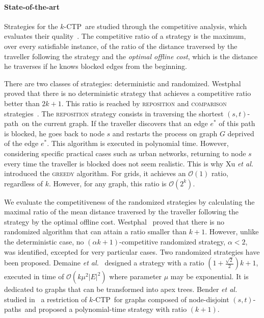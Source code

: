 \documentclass[preprint]{elsarticle}
\newcommand{\kctp}{$k$-CTP}
\newcommand{\card}[1]{\left| #1 \right|}
\newcommand{\stpath}{$(s,t)$-path}
\newcommand{\stpaths}{$(s,t)$-paths}
\begin{document}
\paragraph{State-of-the-art}
Strategies for the \kctp ~are studied through the competitive analysis, which evaluates their quality~\cite{BoEl98}. The competitive ratio of a strategy is the maximum, over every satisfiable instance, of the ratio of the distance traversed by the traveller following the strategy and the \textit{optimal offline cost}, which is the distance he traverses if he knows blocked edges from the beginning. 

There are two classes of strategies: deterministic and randomized. Westphal~\cite{We08} proved that there is no deterministic strategy that achieves a competitive ratio better than $2k+1$. This ratio is reached by \textsc{reposition} and \textsc{comparison} strategies~\cite{We08,XuHuSuZh09}. The \textsc{reposition} strategy consists in traversing the shortest \stpath ~on the current graph. If the traveller discovers that an edge $e^*$ of this path is blocked, he goes back to node $s$ and restarts the process on graph $G$ deprived of the edge $e^*$. 
This algorithm is executed in polynomial time. However, considering specific practical cases such as urban networks, returning to node $s$ every time the traveller is blocked does not seem realistic. This is why Xu {\em et al.\/}~\cite{XuHuSuZh09} introduced the \textsc{greedy} algorithm. For grids, it achieves an $\mathcal{O}\left(1\right)$ ratio, regardless of $k$. However, for any graph, this ratio is $\mathcal{O}\left(2^k\right)$.

We evaluate the competitiveness of the randomized strategies by calculating the maximal ratio of the mean distance traversed by the traveller following the strategy by the optimal offline cost. Westphal~\cite{We08} proved that there is no randomized algorithm that can attain a ratio smaller than $k+1$. However, unlike the deterministic case, no $\left(\alpha k+1\right)$-competitive randomized strategy, $\alpha < 2$, was identified, excepted for very particular cases. Two randomized strategies have been proposed. Demaine {\em et al.\/}~\cite{DeHuLiSa14} designed a strategy with a ratio $\left(1+\frac{\sqrt{2}}{2}\right)k+1$, executed in time of $\mathcal{O}\left(k\mu^2\card{E}^2\right)$ where parameter $\mu$ may be exponential. It is dedicated to graphs that can be transformed into apex trees. 
Bender {\em et al.\/} studied in~\cite{BeWe15} a restriction of \kctp ~for graphs composed of node-disjoint \stpaths ~and proposed a polynomial-time strategy with ratio $\left(k+1\right)$. 
\end{document}
